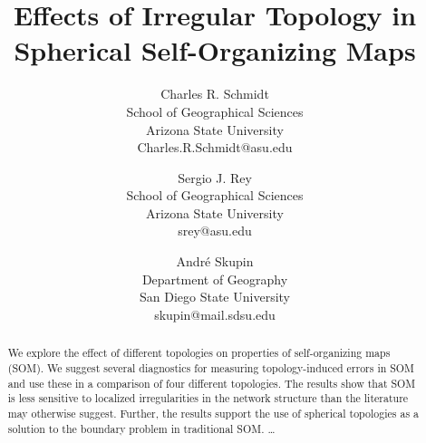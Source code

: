 \documentclass[times, 10pt,twocolumn]{article}
\begin{document}
\title{Effects of Irregular Topology in Spherical Self-Organizing Maps}

\author{
Charles R. Schmidt\\
School of Geographical Sciences\\Arizona State University\\
Charles.R.Schmidt@asu.edu\and
Sergio J. Rey\\
School of Geographical Sciences\\Arizona State University\\srey@asu.edu
\and
Andr\'e Skupin\\
Department of Geography\\San Diego State University\\
skupin@mail.sdsu.edu
}

\maketitle
\thispagestyle{empty}

\begin{abstract}
We explore the effect of different topologies on properties of self-organizing
maps (SOM). We suggest several diagnostics for measuring
topology-induced errors in SOM and use these in a comparison of four different
topologies. The results show that SOM is less sensitive to localized
irregularities in the network structure than the literature may otherwise
suggest.  Further, the results support the use of spherical topologies as a
solution to the boundary problem in traditional SOM. \ldots
  
\end{abstract}













\end{document}
